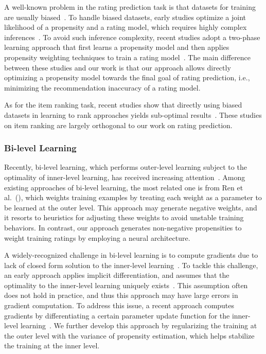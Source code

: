 \documentclass[letterpaper]{article} %
\begin{document}
A well-known problem in the rating prediction task is that datasets for training are usually biased~\cite{marlin2007collaborative}.
To handle biased datasets, early studies optimize a joint likelihood of a propensity and a rating model, which requires highly complex inferences~\cite{marlin2009collaborative,hernandez2014probabilistic}.
To avoid such inference complexity, recent studies adopt a two-phase learning approach that first learns a propensity model and then applies propensity weighting techniques to train a rating model~\cite{schnabel2016recommendations,wang2019doubly}.
The main difference between these studies and our work is that our approach allows directly optimizing a propensity model towards the final goal of rating prediction, i.e., minimizing the recommendation inaccuracy of a rating model.


As for the item ranking task, recent studies show that directly using biased datasets in learning to rank approaches yields sub-optimal results~\cite{ai2018unbiased,joachims2017unbiased}.
These studies on item ranking are largely orthogonal to our work on rating prediction.

\subsubsection{Bi-level Learning}
Recently, bi-level learning, which performs outer-level learning subject to the optimality of inner-level learning, has received increasing attention~\cite{maclaurin2015gradient,jenni2018deep}.
Among existing approaches of bi-level learning, the most related one is from Ren et al.~(\citeyear{ren2018learning}), which weights training examples by treating each weight as a parameter to be learned at the outer level.
This approach may generate negative weights, and it resorts to heuristics for adjusting these weights to avoid unstable training behaviors.
In contrast, our approach generates non-negative propensities to weight training ratings by employing a neural architecture.

A widely-recognized challenge in bi-level learning is to compute gradients due to lack of closed form solution to the inner-level learning~\cite{frecon2018bilevel,shaban2019truncated}.
To tackle this challenge, an early approach applies implicit differentiation, and assumes that the optimality to the inner-level learning uniquely exists~\cite{pedregosa2016hyperparameter}.
This assumption often does not hold in practice, and thus this approach may have large errors in gradient computation.
To address this issue, a recent approach computes gradients by differentiating a certain parameter update function for the inner-level learning~\cite{franceschi2018bilevel}.
We further develop this approach by regularizing the training at the outer level with the variance of propensity estimation, which helps stabilize the training at the inner level.
\end{document}

